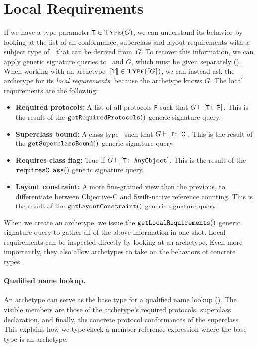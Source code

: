 \documentclass[../generics]{subfiles}
\begin{document}
\section{Local Requirements}\label{local requirements}

If we have a type parameter $\texttt{T} \in \textsc{Type}({G})$, we can understand its behavior by looking at the list of all conformance, superclass and layout requirements with a subject type of~\tT\ that can be derived from~$G$. To recover this information, we can apply generic signature queries to \tT\ and $G$, which must be given separately (). When working with an archetype~$[\![\texttt{T}]\!] \in \textsc{Type}({[\![G]\!]})$, we can instead ask the archetype for its \emph{local requirements}, because the archetype knows $G$. The local requirements are the following:
\begin{itemize}
\item \textbf{Required protocols:} A list of all protocols \texttt{P} such that $G\vdash[\texttt{T:~P}]$. This is the result of the $\texttt{getRequiredProtocols}()$ generic signature query.
\item \textbf{Superclass bound:} A class type \tC\ such that $G\vdash[\texttt{T:~C}]$. This is the result of the $\texttt{getSuperclassBound}()$ generic signature query.
\item \textbf{Requires class flag:} True if $G\vdash[\texttt{T:~AnyObject}]$. This is the result of the $\texttt{requiresClass}()$ generic signature query.
\item \textbf{Layout constraint:} A more fine-grained view than the previous, to differentiate between Objective-C and Swift-native reference counting. This is the result of the $\texttt{getLayoutConstraint}()$ generic signature query.
\end{itemize}
When we create an archetype, we issue the $\texttt{getLocalRequirements}()$ generic signature query to gather all of the above information in one shot. Local requirements can be inspected directly by looking at an archetype. Even more importantly, they also allow archetypes to take on the behaviors of concrete types.

\paragraph{Qualified name lookup.} An archetype can serve as the base type for a qualified name lookup (). The visible members are those of the archetype's required protocols, superclass declaration, and finally, the concrete protocol conformances of the superclass. This explains how we type check a member reference expression where the base type is an archetype.
\end{document}
